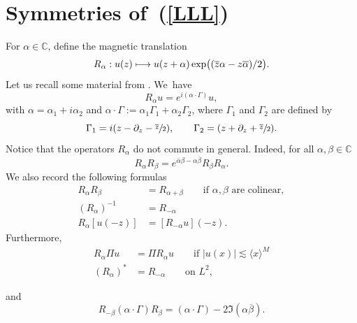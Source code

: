 \documentclass[JEP,XML,SOM,Unicode,NoFloatCountersInSection,published]{cedram}
\newcommand\mto{\mathchoice{\longmapsto}{\mapsto}{\mapsto}{\mapsto}}
\theoremstyle{definition}
\let\EE\exp
\let\ov\overline
\newcommand\C{\mathbb C}
\begin{document}
\section{Symmetries of~(\ref{LLL})}
For $\alpha \in \C$, define the magnetic translation
\begin{equation*}
R_{\alpha}: u (z) \mto u(z+\alpha) \EE\bigl((\overline z \alpha - z \overline{\alpha})/2\bigr).
\end{equation*}
Let us recall some material from \cite[App.\,A]{SchTho}. We~have
\begin{equation*}
R_{\alpha}u=e^{i(\alpha \cdot \Gamma)}u,
\end{equation*}
with $\alpha=\alpha_1+i\alpha_2$ and $\alpha \cdot \Gamma:= \alpha_1 \Gamma_1 +\alpha_2 \Gamma_2$, where $\Gamma_1$ and $\Gamma_2$ are defined by
\begin{equation}\label{infinitesimal}
\Gamma_1=i(z -\partial_z-\sfrac{\ov z}2), \qquad \Gamma_2=(z +\partial_z+\sfrac{\ov z}2).
\end{equation}
Notice that the operators $R_{\alpha}$ do not commute in general. Indeed, for all $\alpha, \beta \in \C$
\begin{equation}\label{commut}
R_{\alpha} R_\beta = e^{ {\ov \alpha} \beta-\alpha \ov{\beta} } R_{\beta} R_{\alpha}.
\end{equation}
We also record the following formulas
\begin{equation}
\label{propRalpha}
\begin{split}
R_\alpha R_\beta &= R_{\alpha + \beta} \qquad \text{if $\alpha,\beta$ are colinear}, \\
(R_\alpha)^{-1} &= R_{-\alpha} \\
R_\alpha [ u(-z) ] &= [R_{-\alpha} u](-z).
\end{split}
\end{equation}
Furthermore,\vspace*{-3pt}
\begin{align}\label{com0}
R_\alpha \Pi u &= \Pi R_\alpha u \qquad \text{if $|u(x)| \lesssim \langle x \rangle^M$} \\
(R_\alpha)^* &= R_{-\alpha} \qquad \text{on $L^2$}, \nonumber
\end{align}
\vspace*{-1.5\baselineskip}
\par\noindent
and\vspace*{-3pt}
\begin{equation}
\label{r-1}
R_{-\beta} (\alpha \cdot \Gamma) R_\beta =(\alpha \cdot \Gamma) -2 \Im(\alpha \ov{\beta}).
\end{equation}
\end{document}
